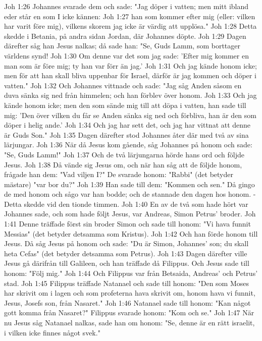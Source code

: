Joh 1:26  Johannes svarade dem och sade: "Jag döper i vatten; men mitt ibland eder står en som I icke kännen:
Joh 1:27  han som kommer efter mig (eller: vilken har varit före mig), vilkens skorem jag icke är värdig att upplösa."
Joh 1:28  Detta skedde i Betania, på andra sidan Jordan, där Johannes döpte.
Joh 1:29  Dagen därefter såg han Jesus nalkas; då sade han: "Se, Guds Lamm, som borttager världens synd!
Joh 1:30  Om denne var det som jag sade: 'Efter mig kommer en man som är före mig; ty han var förr än jag.'
Joh 1:31  Och jag kände honom icke; men för att han skall bliva uppenbar för Israel, därför är jag kommen och döper i vatten."
Joh 1:32  Och Johannes vittnade och sade: "Jag såg Anden såsom en duva sänka sig ned från himmelen; och han förblev över honom.
Joh 1:33  Och jag kände honom icke; men den som sände mig till att döpa i vatten, han sade till mig: 'Den över vilken du får se Anden sänka sig ned och förbliva, han är den som döper i helig ande.'
Joh 1:34  Och jag har sett det, och jag har vittnat att denne är Guds Son."
Joh 1:35  Dagen därefter stod Johannes åter där med två av sina lärjungar.
Joh 1:36  När då Jesus kom gående, såg Johannes på honom och sade: "Se, Guds Lamm!"
Joh 1:37  Och de två lärjungarna hörde hans ord och följde Jesus.
Joh 1:38  Då vände sig Jesus om, och när han såg att de följde honom, frågade han dem: "Vad viljen I?" De svarade honom: "Rabbi" (det betyder mästare) "var bor du?"
Joh 1:39  Han sade till dem: "Kommen och sen." Då gingo de med honom och sågo var han bodde; och de stannade den dagen hos honom. - Detta skedde vid den tionde timmen.
Joh 1:40  En av de två som hade hört var Johannes sade, och som hade följt Jesus, var Andreas, Simon Petrus' broder.
Joh 1:41  Denne träffade först sin broder Simon och sade till honom: "Vi hava funnit Messias" (det betyder detsamma som Kristus).
Joh 1:42  Och han förde honom till Jesus. Då såg Jesus på honom och sade: "Du är Simon, Johannes' son; du skall heta Cefas" (det betyder detsamma som Petrus).
Joh 1:43  Dagen därefter ville Jesus gå därifrån till Galileen, och han träffade då Filippus. Och Jesus sade till honom: "Följ mig."
Joh 1:44  Och Filippus var från Betsaida, Andreas' och Petrus' stad.
Joh 1:45  Filippus träffade Natanael och sade till honom: "Den som Moses har skrivit om i lagen och som profeterna hava skrivit om, honom hava vi funnit, Jesus, Josefs son, från Nasaret."
Joh 1:46  Natanael sade till honom: "Kan något gott komma från Nasaret?" Filippus svarade honom: "Kom och se."
Joh 1:47  När nu Jesus såg Natanael nalkas, sade han om honom: "Se, denne är en rätt israelit, i vilken icke finnes något svek."

